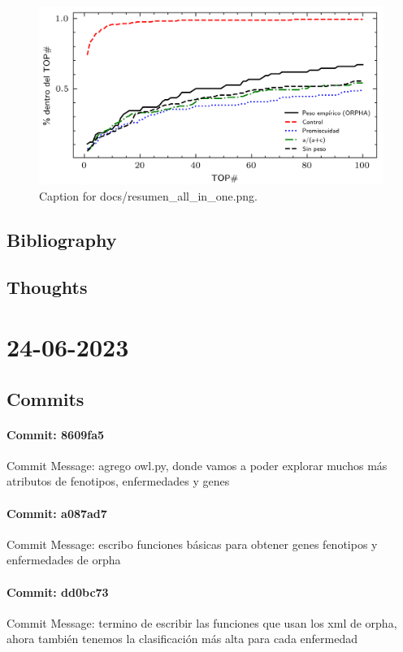 \documentclass{article}
\begin{document}
\begin{figure}[h] \centering \includegraphics{docs/resumen_all_in_one.png} \caption{Caption for docs/resumen_all_in_one.png.} \end{figure}
\subsection{Bibliography}
\subsection{Thoughts}

\section{24-06-2023}
\subsection{Commits}
\paragraph{Commit: 8609fa5}
Commit Message: agrego owl.py, donde vamos a poder explorar muchos más atributos de fenotipos, enfermedades y genes

\paragraph{Commit: a087ad7}
Commit Message: escribo funciones básicas para obtener genes fenotipos y enfermedades de orpha

\paragraph{Commit: dd0bc73}
Commit Message: termino de escribir las funciones que usan los xml de orpha, ahora también tenemos la clasificación más alta para cada enfermedad
\end{document}

